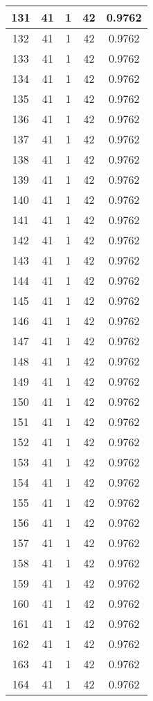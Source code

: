 \documentclass[letterpaper, 12pt]{article}
\begin{document}
\begin{longtable}{|c|c|c|c|c|}
\hline
131 & 41 & 1 & 42 & 0.9762 \\
\hline
132 & 41 & 1 & 42 & 0.9762 \\
\hline
133 & 41 & 1 & 42 & 0.9762 \\
\hline
134 & 41 & 1 & 42 & 0.9762 \\
\hline
135 & 41 & 1 & 42 & 0.9762 \\
\hline
136 & 41 & 1 & 42 & 0.9762 \\
\hline
137 & 41 & 1 & 42 & 0.9762 \\
\hline
138 & 41 & 1 & 42 & 0.9762 \\
\hline
139 & 41 & 1 & 42 & 0.9762 \\
\hline
140 & 41 & 1 & 42 & 0.9762 \\
\hline
141 & 41 & 1 & 42 & 0.9762 \\
\hline
142 & 41 & 1 & 42 & 0.9762 \\
\hline
143 & 41 & 1 & 42 & 0.9762 \\
\hline
144 & 41 & 1 & 42 & 0.9762 \\
\hline
145 & 41 & 1 & 42 & 0.9762 \\
\hline
146 & 41 & 1 & 42 & 0.9762 \\
\hline
147 & 41 & 1 & 42 & 0.9762 \\
\hline
148 & 41 & 1 & 42 & 0.9762 \\
\hline
149 & 41 & 1 & 42 & 0.9762 \\
\hline
150 & 41 & 1 & 42 & 0.9762 \\
\hline
151 & 41 & 1 & 42 & 0.9762 \\
\hline
152 & 41 & 1 & 42 & 0.9762 \\
\hline
153 & 41 & 1 & 42 & 0.9762 \\
\hline
154 & 41 & 1 & 42 & 0.9762 \\
\hline
155 & 41 & 1 & 42 & 0.9762 \\
\hline
156 & 41 & 1 & 42 & 0.9762 \\
\hline
157 & 41 & 1 & 42 & 0.9762 \\
\hline
158 & 41 & 1 & 42 & 0.9762 \\
\hline
159 & 41 & 1 & 42 & 0.9762 \\
\hline
160 & 41 & 1 & 42 & 0.9762 \\
\hline
161 & 41 & 1 & 42 & 0.9762 \\
\hline
162 & 41 & 1 & 42 & 0.9762 \\
\hline
163 & 41 & 1 & 42 & 0.9762 \\
\hline
164 & 41 & 1 & 42 & 0.9762 \\

\end{longtable}
\end{document}
